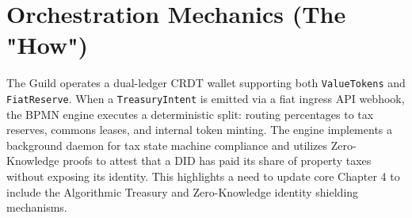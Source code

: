 \section{Orchestration Mechanics (The "How")}
The Guild operates a dual-ledger CRDT wallet supporting both \texttt{ValueTokens} and \texttt{FiatReserve}. When a \texttt{TreasuryIntent} is emitted via a fiat ingress API webhook, the BPMN engine executes a deterministic split: routing percentages to tax reserves, commons leases, and internal token minting. The engine implements a background daemon for tax state machine compliance and utilizes Zero-Knowledge proofs to attest that a DID has paid its share of property taxes without exposing its identity. This highlights a need to update core Chapter 4 to include the Algorithmic Treasury and Zero-Knowledge identity shielding mechanisms.
